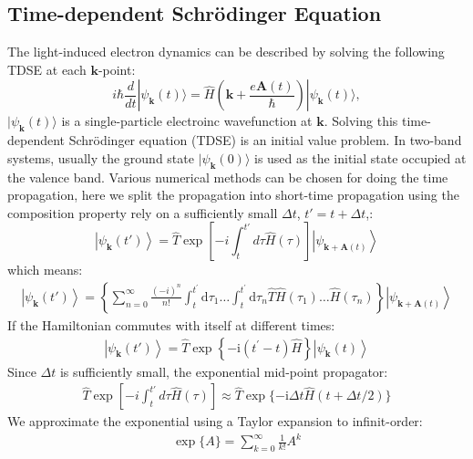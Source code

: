 \subsection{Time-dependent Schr\"odinger Equation}
The light-induced electron dynamics can be described by solving the following \gls {TDSE} at each $\mathbf k$-point:
\begin{equation}
	i\hbar \frac{d}{dt}| \psi_{\mathbf {k}}(t) \rangle = \hat{H}\left ( \mathbf k + \frac{e\mathbf A(t)}{\hbar} \right )| \psi_{\mathbf k}(t) \rangle,
	\label{eqn:TDSE}
\end{equation}
$|\psi_{\mathbf k}(t)\rangle$ is a single-particle electroinc wavefunction at $\mathbf k$.
Solving this time-dependent Schr\"odinger equation (\gls {TDSE}) is an initial value problem. In
two-band systems, usually the ground state $|\psi_{\mathbf k}(0)\rangle$ is used as the initial state
occupied at the valence band.
Various numerical methods can be chosen for doing the time propagation, here we split the propagation into short-time propagation using the composition property rely on a sufficiently small $\Delta t$, $t'=t+\Delta t$,:
\begin{equation}
	\left|\psi_{\mathbf{k}}(t')\right\rangle=\hat{T}\exp \left[-i \int_{t}^{t'} d \tau \hat{H}(\tau) \right]\left|\psi_{\mathbf{k}+\mathbf{A}(t)}\right\rangle
	\label{eqn:deltat}
\end{equation}
which means:
\begin{align}
	\left|\psi_{\mathbf{k}}(t')\right\rangle=\left\{\sum_{n=0}^{\infty} \frac{(-i)^n}{n !} \int_t^{t^{\prime}} \mathrm{d} \tau_1 \ldots \int_t^{t^{\prime}} \mathrm{d} \tau_n \hat{T} \hat{H}\left(\tau_1\right) \ldots \hat{H}\left(\tau_n\right)\right\} \left|\psi_{\mathbf{k}+\mathbf{A}(t)}\right\rangle
\end{align}
If the Hamiltonian commutes with itself at different times:
\begin{align}
	\left|\psi_{\mathbf{k}}(t')\right\rangle=\hat{T}\exp \left\{-\mathrm{i}\left(t^{\prime}-t\right) \hat{H}\right\} \left|\psi_{\mathbf{k}}(t)\right\rangle
\end{align}
Since $\Delta t$ is sufficiently small, the exponential mid-point propagator:
\begin{align}
	\hat{T}	\exp \left[-i \int_{t}^{t'} d \tau \hat{H}(\tau) \right] \approx \hat{T} \exp \{-\mathrm{i} \Delta t \hat{H}(t+\Delta t / 2)\}
\end{align}
We approximate the exponential using a Taylor expansion to infinit-order:
\begin{align}
	\exp \{A\}=\sum_{k=0}^{\infty} \frac{1}{k!} A^k
\end{align}
